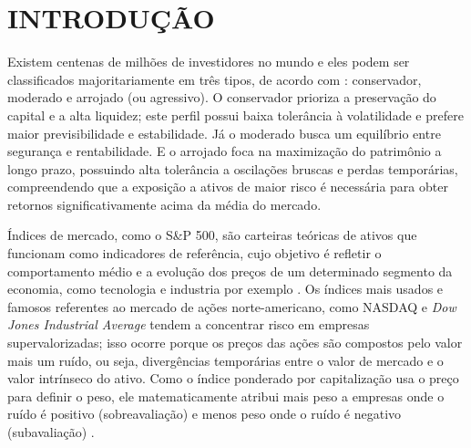 \chapter{INTRODUÇÃO}
\label{introducao}





Existem centenas de milhões de investidores no mundo e eles podem ser classificados majoritariamente em três tipos, de acordo com : conservador, moderado e arrojado (ou agressivo). O conservador prioriza a preservação do capital e a alta liquidez; este perfil possui baixa tolerância à volatilidade e prefere maior previsibilidade e estabilidade. Já o moderado busca um equilíbrio entre segurança e rentabilidade. E o arrojado foca na maximização do patrimônio a longo prazo, possuindo alta tolerância a oscilações bruscas e perdas temporárias, compreendendo que a exposição a ativos de maior risco é necessária para obter retornos significativamente acima da média do mercado.

Índices de mercado, como o S\&P 500, são carteiras teóricas de ativos que funcionam como indicadores de referência, cujo objetivo é refletir o comportamento médio e a evolução dos preços de um determinado segmento da economia, como tecnologia e industria por exemplo \cite{assaf_neto_mercado_2022}. Os índices mais usados e famosos referentes ao mercado de ações norte-americano, como NASDAQ e \textit{Dow Jones Industrial Average} tendem a concentrar risco em empresas supervalorizadas; isso ocorre porque os preços das ações são compostos pelo valor mais um ruído, ou seja, divergências temporárias entre o valor de mercado e o valor intrínseco do ativo. Como o índice ponderado por capitalização usa o preço para definir o peso, ele matematicamente atribui mais peso a empresas onde o ruído é positivo (sobreavaliação) e menos peso onde o ruído é negativo (subavaliação) \cite{siegel_future_2005}.

